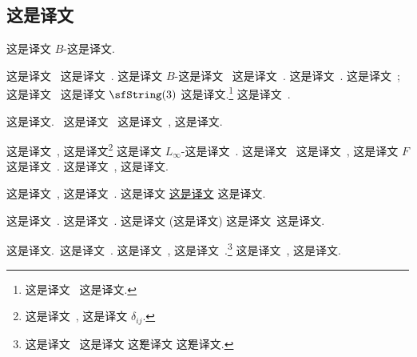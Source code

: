 \documentclass[
    affil-it, %
    auth-lg, %
    british, %
    compression, %
    contents, %
    custom-packages={}, %
    references={bigone}, %
]{lib/preprint}
\begin{document}
    
    \begin{body}
        
        \section{这是译文}   
        
 这是译文 $B$-这是译文. 
        
 这是译文~\cite{Murray:9407015,Murray:2007ps} 这是译文~\cite{Hitchin:1999fh,Chatterjee:1998}. 这是译文 $B$-这是译文~\cite{Bergshoeff:1981um,Chapline:1982ww} 这是译文~\cite{Nikolaus:2018qop}. 这是译文~\cite{Kim:2022opr}. 这是译文~\cite{Saemann:2017zpd,Saemann:2019dsl,Rist:2020uaa}; 这是译文~\cite{Fiorenza:2020hiq} 这是译文 $\sfString(3)$ 这是译文.\footnote{这是译文~\cite{Jurco:2019woz} 这是译文.} 这是译文~\cite{Saemann:2012uq,Saemann:2013pca,Jurco:2014mva,Jurco:2016qwv,Samann:2017dah}.
        
 这是译文.~\cite{Nikolaus:2011ag} 这是译文~\cite{Breen:math0106083} 这是译文~\cite{Aschieri:2003mw}, 这是译文. 
        
这是译文~\cite{Breen:math0106083,Aschieri:2003mw}, 这是译文\footnote{这是译文~\cite{Breen:math0106083,Aschieri:2003mw}, 这是译文 $\delta_{ij}$.} 这是译文 $L_\infty$-这是译文~\cite{Sati:2008eg}. 这是译文~\cite{Baez:0511710,Schreiber:0705.0452,Schreiber:2008aa} 这是译文~\cite{Baez:0511710}, 这是译文 $F$ 这是译文~\cite{Schreiber:0705.0452,Schreiber:2008aa}. 这是译文~\cite{Gastel:2018joi,Saemann:2019dsl}, 这是译文.
        
 这是译文~\cite{Baez:0511710}, 这是译文~\cite{Breen:math0106083,Aschieri:2003mw}. 这是译文 \uline{这是译文} 这是译文. 
        
 这是译文~\cite{Bergshoeff:1981um,Chapline:1982ww}. 这是译文~\cite{Sati:2008eg,Sati:2009ic,Fiorenza:2010mh}. 这是译文 (这是译文) 这是译文~这是译文.
        
 这是译文.~这是译文~\cite{Baez:0511710}. 这是译文~\cite{Saemann:2019dsl}, 这是译文~\cite{Kim:2019owc}.\footnote{这是译文~\cite{Kim:2019owc} 这是译文 \v 这是译文 \v 这是译文.} 这是译文~\cite{Borsten:2021ljb}, 这是译文.
        

\end{body}
\end{document}
